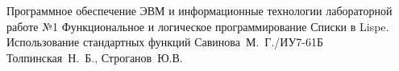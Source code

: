 \documentclass{bmstu}
\begin{document}
	
	{Программное обеспечение ЭВМ и информационные технологии}
	{лабораторной работе №1}
	{Функциональное и логическое программирование}
	{Списки в Lispe. Использование стандартных функций}
	{}
	{Савинова~М.~Г./ИУ7-61Б}
	{Толпинская~Н.~Б., Строганов~Ю.В.}
	
	\maketableofcontents
	
	
	
	
	
\end{document}
